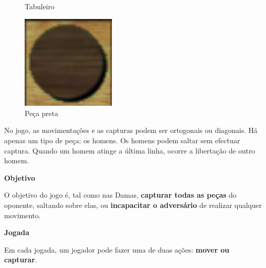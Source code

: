 \documentclass[a4paper]{article}
\begin{document}
\begin{small}
\begin{figure}[h!]
\begin{minipage}[h!]{0.2\textwidth}
    \caption{Tabuleiro}
    \label{fig:3}
  \end{minipage}
	\quad\quad\quad
  \begin{minipage}[h!]{0.2\textwidth}
    \includegraphics[width=0.4\textwidth]{res/black_piece.png}
	\centering
    \caption{Peça preta}
    \label{fig:4}
  \end{minipage}
\end{figure}

No jogo, as movimentações e as capturas podem ser ortogonais ou diagonais. Há apenas um tipo de peça: os homens. Os homens podem saltar sem efectuar captura. Quando um homem atinge a última linha, ocorre a libertação de outro homem.
\end{small}\newline

\large{\textbf{Objetivo}}
\begin{small}

O objetivo do jogo é, tal como nas Damas, \textbf{capturar todas as peças} do oponente, saltando sobre elas, ou \textbf{incapacitar o adversário} de realizar qualquer movimento.
\end{small}\newline

\large{\textbf{Jogada}}
\begin{small}

Em cada jogada, um jogador pode fazer uma de duas ações: \textbf{mover ou capturar}.
\end{small}\newline
\end{document}
